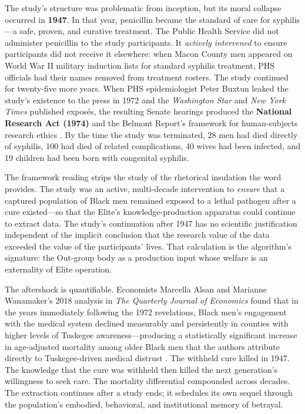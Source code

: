 The study's structure was problematic from inception, but its moral collapse occurred in \textbf{1947}. In that year, penicillin became the standard of care for syphilis---a safe, proven, and curative treatment. The Public Health Service did not administer penicillin to the study participants. It \textit{actively intervened} to ensure participants did not receive it elsewhere: when Macon County men appeared on World War II military induction lists for standard syphilis treatment, PHS officials had their names removed from treatment rosters. The study continued for twenty-five more years. When PHS epidemiologist Peter Buxtun leaked the study's existence to the press in 1972 and the \textit{Washington Star} and \textit{New York Times} published exposés, the resulting Senate hearings produced the \textbf{National Research Act (1974)} and the Belmont Report's framework for human-subjects research ethics \cite{reverby_tuskegee}. By the time the study was terminated, 28 men had died directly of syphilis, 100 had died of related complications, 40 wives had been infected, and 19 children had been born with congenital syphilis.

The framework reading strips the study of the rhetorical insulation the word provides. The study was an active, multi-decade intervention to \textit{ensure} that a captured population of Black men remained exposed to a lethal pathogen after a cure existed---so that the Elite's knowledge-production apparatus could continue to extract data. The study's continuation after 1947 has no scientific justification independent of the implicit conclusion that the research value of the data exceeded the value of the participants' lives. That calculation is the algorithm's signature: the Out-group body as a production input whose welfare is an externality of Elite operation.

The aftershock is quantifiable. Economists Marcella Alsan and Marianne Wanamaker's 2018 analysis in \textit{The Quarterly Journal of Economics} found that in the years immediately following the 1972 revelations, Black men's engagement with the medical system declined measurably and persistently in counties with higher levels of Tuskegee awareness---producing a statistically significant increase in age-adjusted mortality among older Black men that the authors attribute directly to Tuskegee-driven medical distrust \cite{alsan_wanamaker}. The withheld cure killed in 1947. The knowledge that the cure was withheld then killed the next generation's willingness to seek care. The mortality differential compounded across decades. The extraction continues after a study ends; it schedules its own sequel through the population's embodied, behavioral, and institutional memory of betrayal.

